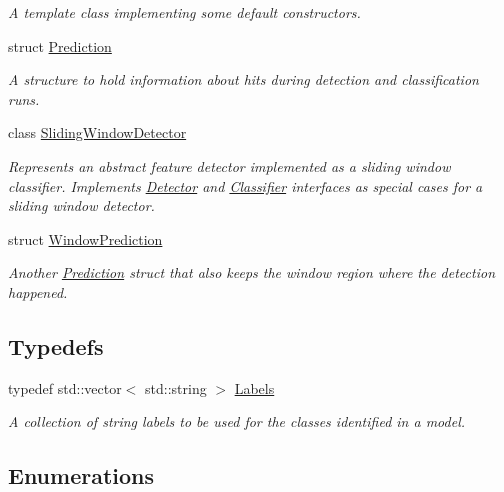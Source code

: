 \begin{DoxyCompactItemize}
\begin{DoxyCompactList}\small\item\em A template class implementing some default constructors. \end{DoxyCompactList}\item 
struct \hyperlink{structdg_1_1deepcore_1_1classification_1_1_prediction}{Prediction}
\begin{DoxyCompactList}\small\item\em A structure to hold information about hits during detection and classification runs. \end{DoxyCompactList}\item 
class \hyperlink{classdg_1_1deepcore_1_1classification_1_1_sliding_window_detector}{Sliding\+Window\+Detector}
\begin{DoxyCompactList}\small\item\em Represents an abstract feature detector implemented as a sliding window classifier. Implements \hyperlink{classdg_1_1deepcore_1_1classification_1_1_detector}{Detector} and \hyperlink{classdg_1_1deepcore_1_1classification_1_1_classifier}{Classifier} interfaces as special cases for a sliding window detector. \end{DoxyCompactList}\item 
struct \hyperlink{structdg_1_1deepcore_1_1classification_1_1_window_prediction}{Window\+Prediction}
\begin{DoxyCompactList}\small\item\em Another \hyperlink{structdg_1_1deepcore_1_1classification_1_1_prediction}{Prediction} struct that also keeps the window region where the detection happened. \end{DoxyCompactList}\end{DoxyCompactItemize}
\subsection*{Typedefs}
\begin{DoxyCompactItemize}
\item 
typedef std\+::vector$<$ std\+::string $>$ \hyperlink{group___classification_module_ga4c4d47162fed299b627f2e9d17381866}{Labels}
\begin{DoxyCompactList}\small\item\em A collection of string labels to be used for the classes identified in a model. \end{DoxyCompactList}\end{DoxyCompactItemize}
\subsection*{Enumerations}
